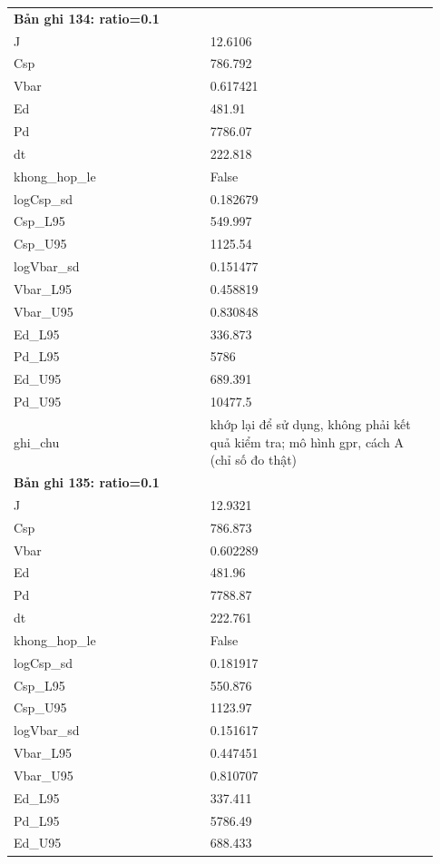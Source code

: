 \begin{longtable}{p{0.43\linewidth}p{0.50\linewidth}}
\midrule
\multicolumn{2}{p{0.95\linewidth}}{\textbf{Bản ghi 134: ratio=0.1}} \\
J & 12.6106 \\
Csp & 786.792 \\
Vbar & 0.617421 \\
Ed & 481.91 \\
Pd & 7786.07 \\
dt & 222.818 \\
khong\_\allowbreak hop\_\allowbreak le & False \\
logCsp\_\allowbreak sd & 0.182679 \\
Csp\_\allowbreak L95 & 549.997 \\
Csp\_\allowbreak U95 & 1125.54 \\
logVbar\_\allowbreak sd & 0.151477 \\
Vbar\_\allowbreak L95 & 0.458819 \\
Vbar\_\allowbreak U95 & 0.830848 \\
Ed\_\allowbreak L95 & 336.873 \\
Pd\_\allowbreak L95 & 5786 \\
Ed\_\allowbreak U95 & 689.391 \\
Pd\_\allowbreak U95 & 10477.5 \\
ghi\_\allowbreak chu & khớp lại để sử dụng, không phải kết quả kiểm tra; mô hình gpr, cách A (chỉ số đo thật) \\
\midrule
\multicolumn{2}{p{0.95\linewidth}}{\textbf{Bản ghi 135: ratio=0.1}} \\
J & 12.9321 \\
Csp & 786.873 \\
Vbar & 0.602289 \\
Ed & 481.96 \\
Pd & 7788.87 \\
dt & 222.761 \\
khong\_\allowbreak hop\_\allowbreak le & False \\
logCsp\_\allowbreak sd & 0.181917 \\
Csp\_\allowbreak L95 & 550.876 \\
Csp\_\allowbreak U95 & 1123.97 \\
logVbar\_\allowbreak sd & 0.151617 \\
Vbar\_\allowbreak L95 & 0.447451 \\
Vbar\_\allowbreak U95 & 0.810707 \\
Ed\_\allowbreak L95 & 337.411 \\
Pd\_\allowbreak L95 & 5786.49 \\
Ed\_\allowbreak U95 & 688.433 \\

\end{longtable}
